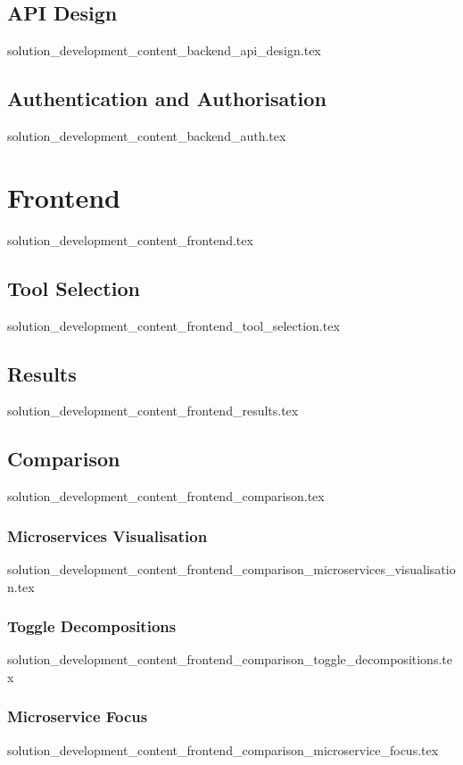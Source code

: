 \subsection{API Design}
  {solution_development_content_backend_api_design.tex}
\subsection{Authentication and Authorisation}\label{sub:backend_auth}
  {solution_development_content_backend_auth.tex}

\section{Frontend}\label{sub:frontend}
  {solution_development_content_frontend.tex}
\subsection{Tool Selection}\label{sub:frontend_tool_selection}
  {solution_development_content_frontend_tool_selection.tex}
\subsection{Results}\label{sub:frontend_results}
  {solution_development_content_frontend_results.tex}
\subsection{Comparison}\label{sub:frontend_comparison}
  {solution_development_content_frontend_comparison.tex}

  \subsubsection*{Microservices Visualisation}\label{sub:frontend_comparison_microservices_visualisation}
    {solution_development_content_frontend_comparison_microservices_visualisation.tex}
  \subsubsection*{Toggle Decompositions}\label{sub:frontend_comparison_toggle_decompositions}
    {solution_development_content_frontend_comparison_toggle_decompositions.tex}
  \subsubsection*{Microservice Focus}\label{sub:frontend_comparison_microservice_focus}
    {solution_development_content_frontend_comparison_microservice_focus.tex}
